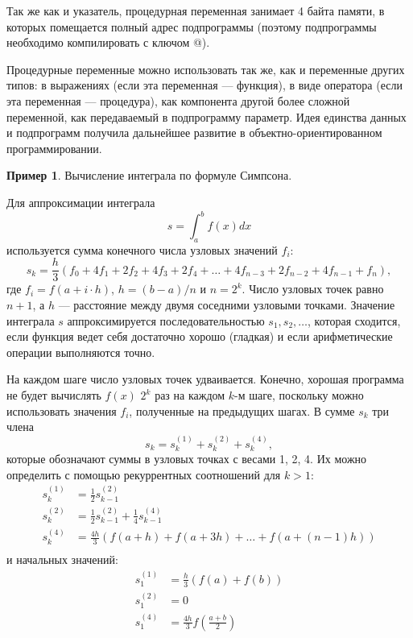 \documentclass[12pt,a4paper]{article}
\theoremstyle{plain}
\theoremstyle{definition}
\newtheorem*{example}{Пример}
\theoremstyle{remark}
\begin{document}
Так же как и указатель, процедурная переменная занимает 4 байта памяти, в которых помещается полный адрес подпрограммы (поэтому подпрограммы необходимо компилировать с ключом @).

Процедурные переменные можно использовать так же, как и переменные других типов: в выражениях (если эта переменная --- функция), в виде оператора (если эта переменная --- процедура), как компонента другой более сложной переменной, как передаваемый в подпрограмму параметр. Идея единства данных и подпрограмм получила дальнейшее развитие в объектно-ориентированном программировании.

\begin{example}
Вычисление интеграла по формуле Симпсона.
\end{example}

Для аппроксимации интеграла \[ s = \int_a^b f(x) dx \] используется сумма конечного числа узловых значений $f_i$:
\[ s_k = \frac{h}{3} (f_0 + 4f_1+2f_2+4f_3+2f_4+\ldots+4f_{n-3}+2f_{n-2}+4f_{n-1}+f_n),\]
где $f_i=f(a+i\cdot h)$, $h=(b-a)/n$ и $n=2^k$. Число узловых точек равно $n+1$, а $h$ --- расстояние между двумя соседними узловыми точками. Значение интеграла $s$ аппроксимируется последовательностью $s_1, s_2,\ldots$, которая сходится, если функция ведет себя достаточно хорошо (гладкая) и если арифметические операции выполняются точно.

На каждом шаге число узловых точек удваивается. Конечно, хорошая программа не будет вычислять $f(x)$ $2^k$ раз на каждом $k$-м шаге, поскольку можно использовать значения $f_i$, полученные на предыдущих шагах. В сумме $s_k$ три члена
\[ s_k = s_k^{(1)} + s_k^{(2)} + s_k^{(4)}, \]
которые обозначают суммы в узловых точках с весами 1, 2, 4. Их можно определить с помощью рекуррентных соотношений для $k>1$:
\begin{align*}
    s_k^{(1)} &= \frac{1}{2} s_{k-1}^{(2)} \\
    s_k^{(2)} &= \frac{1}{2} s_{k-1}^{(2)} + \frac{1}{4} s_{k-1}^{(4)} \\
    s_k^{(4)} &= \frac{4h}{3} (f(a+h)+f(a+3h)+\ldots+f(a+(n-1)h)) \\
\end{align*}
и начальных значений:
\begin{align*}
    s_1^{(1)} &= \frac{h}{3} (f(a) + f(b)) \\
    s_1^{(2)} &= 0 \\
    s_1^{(4)} &= \frac{4h}{3} f(\frac{a+b}{2}) \\
\end{align*}
\end{document}
